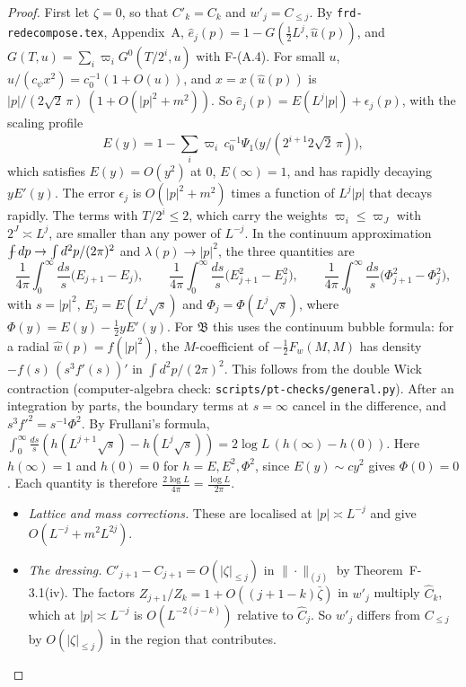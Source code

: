 \documentclass[11pt]{amsart}
\theoremstyle{definition}
\theoremstyle{remark}
\numberwithin{equation}{section}
\newcommand{\avint}{\mathop{\,\rlap{--}\!\!\int}\nolimits}
\newcommand{\frd}{\texttt{frd-redecompose.tex}}
\begin{document}
\begin{proof}
First let $\zeta=0$, so that $C'_k=C_k$ and $w'_j=C_{\le j}$. By \frd{}, Appendix~A,
$\hat e_j(p)=1-G(\frac12L^j,\hat u(p))$, and $G(T,u)=\sum_i\varpi_iG^0(T/2^i,u)$ with
F-(A.4). For small $u$, $u/(c_\psi x^2)=c_0^{-1}(1+O(u))$, and $x=x(\hat u(p))$ is
$|p|/(2\sqrt2\,\pi)\,(1+O(|p|^2+m^2))$. So $\hat e_j(p)=E(L^j|p|)+\epsilon_j(p)$, with the
scaling profile
\[
  E(y)=1-\sum_i\varpi_i\,c_0^{-1}\Psi_1\bigl(y/(2^{i+1}2\sqrt2\,\pi)\bigr),
\]
which satisfies $E(y)=O(y^2)$ at $0$, $E(\infty)=1$, and has rapidly decaying $yE'(y)$. The
error $\epsilon_j$ is $O(|p|^2+m^2)$ times a function of $L^j|p|$ that decays rapidly. The
terms with $T/2^i\le2$, which carry the weights $\varpi_i\le\varpi_{J}$ with $2^J\asymp L^j$, are
smaller than any power of $L^{-j}$. In the continuum approximation $\avint dp\to\int d^2p/(2\pi)^2$
and $\lambda(p)\to|p|^2$, the three quantities are
\[
  \frac1{4\pi}\int_0^\infty\frac{ds}{s}\bigl(E_{j+1}-E_j\bigr),\qquad
  \frac1{4\pi}\int_0^\infty\frac{ds}{s}\bigl(E_{j+1}^2-E_j^2\bigr),\qquad
  \frac1{4\pi}\int_0^\infty\frac{ds}{s}\bigl(\Phi_{j+1}^2-\Phi_j^2\bigr),
\]
with $s=|p|^2$, $E_j=E(L^j\sqrt s)$ and $\Phi_j=\Phi(L^j\sqrt s)$, where $\Phi(y)=E(y)-\frac12yE'(y)$.
For $\mathfrak B$ this uses the continuum bubble formula: for a radial
$\hat w(p)=f(|p|^2)$, the $M$-coefficient of $-\frac12F_w(M,M)$ has density
$-f(s)\,(s^3f'(s))'$ in $\int d^2p/(2\pi)^2$. This follows from the double Wick contraction
(computer-algebra check: \texttt{scripts/pt-checks/general.py}). After an integration by
parts, the boundary terms at $s=\infty$ cancel in the difference, and
$s^3f'^2=s^{-1}\Phi^2$. By Frullani's formula,
$\int_0^\infty\frac{ds}{s}(h(L^{j+1}\sqrt s)-h(L^j\sqrt s))=2\log L\,(h(\infty)-h(0))$. Here
$h(\infty)=1$ and $h(0)=0$ for $h=E,E^2,\Phi^2$, since $E(y)\sim cy^2$ gives $\Phi(0)=0$. Each
quantity is therefore $\frac{2\log L}{4\pi}=\frac{\log L}{2\pi}$.
\begin{itemize}
\item \emph{Lattice and mass corrections.} These are localised at $|p|\asymp L^{-j}$ and give
  $O(L^{-j}+m^2L^{2j})$.
\item \emph{The dressing.} $C'_{j+1}-C_{j+1}=O(|\zeta|_{\le j})$ in $\|\cdot\|_{(j)}$ by
  Theorem~F-3.1(iv). The factors $Z_{j+1}/Z_k=1+O((j+1-k)\bar\zeta)$ in $w'_j$
  multiply $\hat C_k$, which at $|p|\asymp L^{-j}$ is $O(L^{-2(j-k)})$ relative to $\hat C_j$.
  So $w'_j$ differs from $C_{\le j}$ by $O(|\zeta|_{\le j})$ in the region that contributes.
\end{itemize}
\end{proof}
\end{document}
